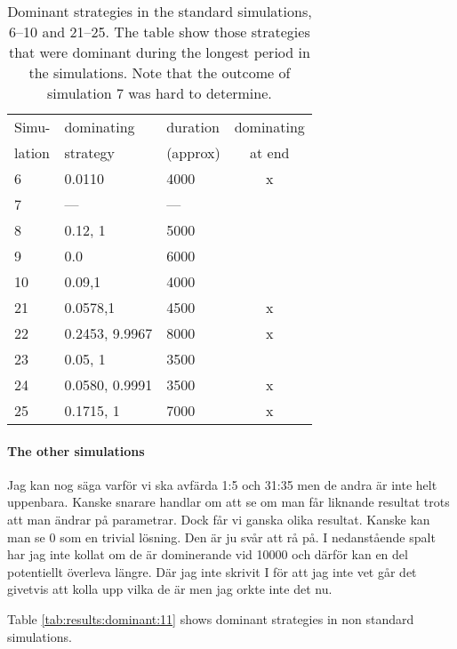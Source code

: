 \begin{table}[!hbtp]
  \footnotesize
  \centering
  \label{tab:results:dominant:6}
  \caption{Dominant strategies in the standard simulations, 6--10 and
    21--25. The table show those strategies that were dominant during
    the longest period in the simulations. Note that the outcome of
    simulation 7 was hard to determine.}
  \begin{tabular}{lllc}
    Simu-  & dominating & duration  & dominating \\
    lation & strategy   & (approx)  & at end \\
    \hline
    6  & 0.0110         & 4000 & x \\          
    7  & ---            & --- &            \\
    8  & 0.12, 1        & 5000 &            \\ 
    9  & 0.0            & 6000 &            \\ 
    10 & 0.09,1         & 4000 &            \\ 
    21 & 0.0578,1       & 4500 & x \\          
    22 & 0.2453, 9.9967 & 8000 & x \\          
    23 & 0.05, 1        & 3500 &            \\ 
    24 & 0.0580, 0.9991 & 3500 & x \\          
    25 & 0.1715, 1      & 7000 & x \\          
    \hline
  \end{tabular}
\end{table}


\paragraph{The other simulations} Jag kan nog säga varför vi ska avfärda 1:5 och 31:35 men de andra är inte helt uppenbara. Kanske
snarare handlar om att se om man får liknande resultat trots att man ändrar på parametrar. Dock får vi
ganska olika resultat. Kanske kan man se 0 som en trivial lösning. Den är ju svår att rå på. I
nedanstående spalt har jag inte kollat om de är dominerande vid 10000 och därför kan en del
potentiellt överleva längre. Där jag inte skrivit I för att jag inte vet går det givetvis att kolla upp vilka
de är men jag orkte inte det nu.\mypar

Table \ref{tab:results:dominant:11} shows dominant strategies in non standard simulations.

